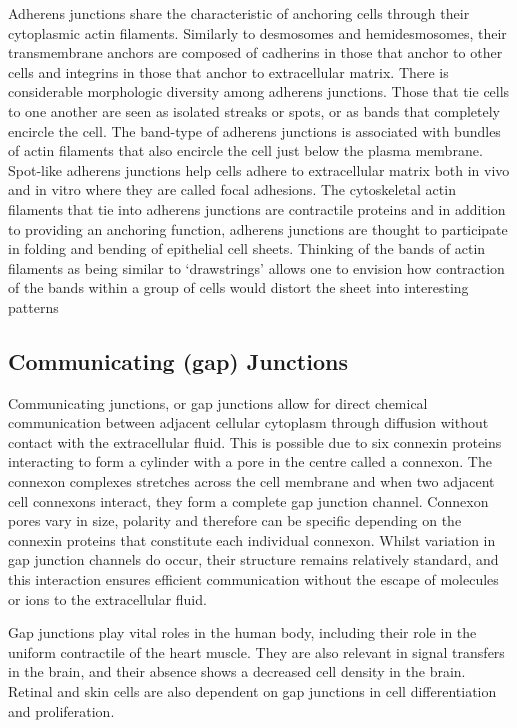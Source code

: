 \documentclass[
]{book}
\begin{document}
Adherens junctions share the characteristic of anchoring cells through their cytoplasmic actin filaments. Similarly to desmosomes and hemidesmosomes, their transmembrane anchors are composed of cadherins in those that anchor to other cells and integrins in those that anchor to extracellular matrix. There is considerable morphologic diversity among adherens junctions. Those that tie cells to one another are seen as isolated streaks or spots, or as bands that completely encircle the cell. The band-type of adherens junctions is associated with bundles of actin filaments that also encircle the cell just below the plasma membrane. Spot-like adherens junctions help cells adhere to extracellular matrix both in vivo and in vitro where they are called focal adhesions. The cytoskeletal actin filaments that tie into adherens junctions are contractile proteins and in addition to providing an anchoring function, adherens junctions are thought to participate in folding and bending of epithelial cell sheets. Thinking of the bands of actin filaments as being similar to `drawstrings' allows one to envision how contraction of the bands within a group of cells would distort the sheet into interesting patterns

\hypertarget{communicating-gap-junctions}{%
\subsection{Communicating (gap) Junctions}\label{communicating-gap-junctions}}

Communicating junctions, or gap junctions allow for direct chemical communication between adjacent cellular cytoplasm through diffusion without contact with the extracellular fluid. This is possible due to six connexin proteins interacting to form a cylinder with a pore in the centre called a connexon. The connexon complexes stretches across the cell membrane and when two adjacent cell connexons interact, they form a complete gap junction channel. Connexon pores vary in size, polarity and therefore can be specific depending on the connexin proteins that constitute each individual connexon. Whilst variation in gap junction channels do occur, their structure remains relatively standard, and this interaction ensures efficient communication without the escape of molecules or ions to the extracellular fluid.

Gap junctions play vital roles in the human body, including their role in the uniform contractile of the heart muscle. They are also relevant in signal transfers in the brain, and their absence shows a decreased cell density in the brain. Retinal and skin cells are also dependent on gap junctions in cell differentiation and proliferation.
\end{document}
